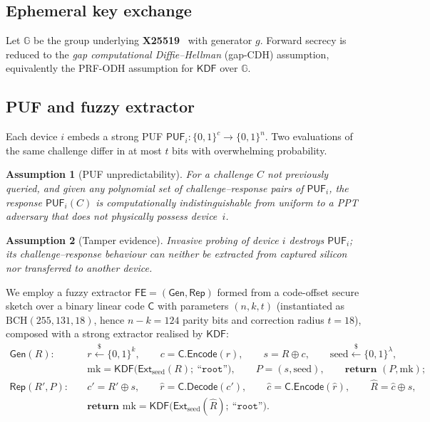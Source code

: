 \documentclass[11pt,a4paper]{article}
\theoremstyle{jrnlplain}
\theoremstyle{jrnldef}
\newtheorem{assumption}{Assumption}
\newcommand{\PUF}{\mathsf{PUF}}
\newcommand{\mk}{\mathrm{mk}}
\newcommand{\KDF}{\mathsf{KDF}}
\newcommand{\Ext}{\mathsf{Ext}}
\newcommand{\Codec}{\mathsf{C}}
\newcommand{\Gen}{\mathsf{Gen}}
\newcommand{\Rep}{\mathsf{Rep}}
\newcommand{\FE}{\mathsf{FE}}
\newcommand{\secpar}{\lambda}
\newcommand{\bits}{\{0,1\}}
\newcommand{\getsr}{\xleftarrow{\$}}
\newcommand{\lbl}[1]{\text{``}\texttt{#1}\text{''}}
\newcommand{\xorop}{\oplus}
\begin{document}
\medskip
\subsection{Ephemeral key exchange}
Let $\mathbb{G}$ be the group underlying \textbf{X25519}~\cite{bernstein2006}
with generator $g$. Forward secrecy is reduced to the \emph{gap computational
Diffie--Hellman} (gap-CDH) assumption, equivalently the PRF-ODH assumption for
$\KDF$ over $\mathbb{G}$.

\medskip
\subsection{PUF and fuzzy extractor}
Each device $i$ embeds a strong PUF $\PUF_i:\bits^{c}\to\bits^{n}$. Two
evaluations of the same challenge differ in at most $t$ bits with
overwhelming probability.

\begin{assumption}[PUF unpredictability]\label{ass:puf}
For a challenge $C$ not previously queried, and given any polynomial set of
challenge--response pairs of $\PUF_i$, the response $\PUF_i(C)$ is
computationally indistinguishable from uniform to a PPT adversary that does
not physically possess device~$i$.
\end{assumption}

\begin{assumption}[Tamper evidence]\label{ass:tamper}
Invasive probing of device $i$ destroys $\PUF_i$; its challenge--response
behaviour can neither be extracted from captured silicon nor transferred to
another device.
\end{assumption}

We employ a fuzzy extractor $\FE=(\Gen,\Rep)$ formed from a code-offset secure
sketch over a binary linear code $\Codec$ with parameters $(n,k,t)$
(instantiated as $\mathrm{BCH}(255,131,18)$, hence $n-k=124$ parity bits and
correction radius $t=18$), composed with a strong extractor realised by
$\KDF$:
\begin{align}
\Gen(R):\quad
   & r\getsr\bits^{k},\qquad c=\Codec.\mathsf{Encode}(r),\qquad
     s = R\xorop c,\qquad \mathrm{seed}\getsr\bits^{\secpar},\\[1ex]
   & \mk=\KDF\big(\Ext_{\mathrm{seed}}(R);\ \lbl{root}\big),\qquad
     P=(s,\mathrm{seed}),\qquad \textbf{return } (P,\mk); \label{eq:gen}\\[2ex]
\Rep(R',P):\quad
   & c' = R'\xorop s,\qquad \hat r=\Codec.\mathsf{Decode}(c'),\qquad
     \hat c=\Codec.\mathsf{Encode}(\hat r),\qquad \hat R=\hat c\xorop s,\\[1ex]
   & \textbf{return } \mk=\KDF\big(\Ext_{\mathrm{seed}}(\hat R);\ \lbl{root}\big).
     \label{eq:rep}
\end{align}
\end{document}
